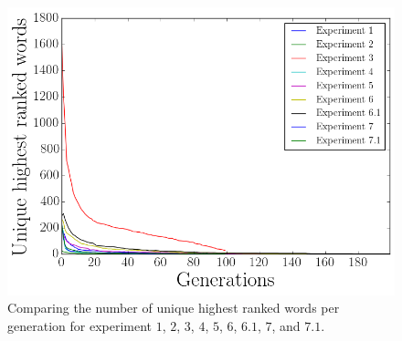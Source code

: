 \begin{figure}
    \centering
    \includegraphics[width=0.7\linewidth]{fig/Discussion/hrwComparison}
    \caption{Comparing the number of unique highest ranked words per generation for experiment $1$, $2$, $3$, $4$, $5$, $6$, $6.1$, $7$, and $7.1$.}
    \label{fig:hrwComp}
\end{figure}